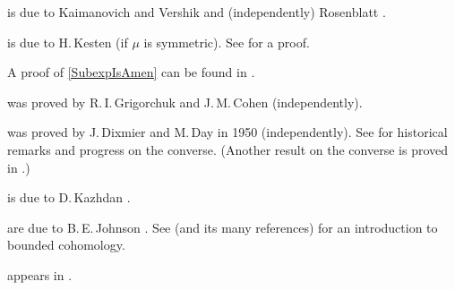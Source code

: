 \begin{notes}
 is due to Kaimanovich and Vershik \cite[Thms.~4.2 and~4.4]{KaimanovichVershik-RandWalksBdryEntropy} and (independently) Rosenblatt \cite[Props.~1.2 and 1.9 and Thm.~1.10]{Rosenblatt-ErgMixRandWalks}.

 is due to H.\,Kesten (if $\mu$ is symmetric). See \cite[G.4.4]{BekkaHarpeValette-T} for a proof.

A proof of \cref{SubexpIsAmen} can be found in \cite[Props.~12.5 and~12.5]{PierBook}.

 was proved by R.\,I.\,Grigorchuk \cite{Grigorchuk-SymmRandWalks} and J.\,M.\,Cohen \cite{Cohen-cogrowth} (independently). 

 was proved by J.\,Dixmier and M.\,Day in 1950 (independently). 
See \cite{Pisier-UnitAmen} for historical remarks and progress on the converse.
(Another result on the converse is proved in \cite{MonodOzawa-Unitarizable}.)

 is due to D.\,Kazhdan \cite{Kazhdan-EpsilonRep}.

 are due to B.\,E.\,Johnson \cite{Johnson-CohoBanachAlg}. See \cite{Monod-InvBddCoho} (and its many references) for an introduction to bounded cohomology.

 appears in \cite[6.17 and 6.17\hbox{$\scriptstyle\frac{1}{2}$}, p.~328]{Gromov-MetricStructures}.

\end{notes}


